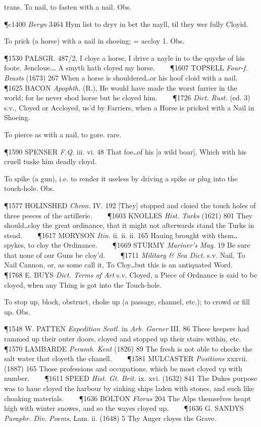 \begin{description}[wide, labelwidth=!, labelindent=0pt]
\begin{myenumerate}

 trans. To nail, to fasten with a nail. Obs.

\P c1400  \textit{Beryn} 3464 Hym list to dryv in bet the nayll, til they wer fully Cloyid.

 To prick (a horse) with a nail in shoeing; = accloy 1. Obs.

\P 1530 PALSGR. 487/2, I cloye a horse, I drive a nayle in to the quycke of his foote. Jencloue.‥ A smyth hath cloyed my horse.    
\P 1607 TOPSELL  \textit{Four-f. Beasts} (1673) 267 When a horse is shouldered‥or his hoof cloid with a nail.    
\P 1625 BACON  \textit{Apophth.} (R.), He would have made the worst farrier in the world; for he never shod horse but he cloyed him.    
\P 1726 \textit{Dict.  Rust.} (ed. 3) s.v., Cloyed or Accloyed, us'd by Farriers, when a Horse is pricked with a Nail in Shoeing.

 To pierce as with a nail, to gore. rare.

\P 1590 SPENSER  \textit{F.Q.} iii. vi. 48 That foe‥of his [a wild boar], Which with his cruell tuske him deadly cloyd.

 To spike (a gun), i.e. to render it useless by driving a spike or plug into the touch-hole. Obs.

\P 1577 HOLINSHED  \textit{Chron.} IV. 192 [They] stopped and cloied the touch holes of three peeces of the artillerie.    
\P 1603 KNOLLES  \textit{Hist. Turks} (1621) 801 They should‥cloy the great ordinance, that it might not afterwards stand the Turks in stead.    
\P 1617 MORYSON  \textit{Itin.} ii. ii. ii. 165 Hauing brought with them‥spykes, to cloy the Ordinance.    
\P 1669 STURMY  \textit{Mariner's Mag.} 19 Be sure that none of our Guns be cloy'd.    
\P 1711 \textit{Military \& Sea  Dict.} s.v. Nail, To Nail Cannon, or, as some call it, To Cloy‥but this is an antiquated Word.    
\P 1768 E. BUYS  \textit{Dict. Terms of Art} s.v. Cloyed, a Piece of Ordnance is said to be cloyed, when any Thing is got into the Touch-hole.

 To stop up, block, obstruct, choke up (a passage, channel, etc.); to crowd or fill up. Obs.

\P 1548 W. PATTEN  \textit{Expedition Scotl.} in \textit{Arb. Garner} III. 86 These keepers had rammed up their outer doors, cloyed and stopped up their stairs within, etc.    
\P 1570 LAMBARDE  \textit{Peramb. Kent} (1826) 89 The fresh is not able to checke the salt water that cloyeth the chanell.    
\P 1581 MULCASTER  \textit{Positions} xxxvii. (1887) 165 Those professions and occupations, which be most cloyed vp with number.    
\P 1611 SPEED  \textit{Hist. Gt. Brit.} ix. xvi. (1632) 841 The Dukes purpose was to haue cloyed the harbour by sinking ships laden with stones, and such like choaking materials.    
\P 1636 BOLTON  \textit{Florus} 204 The Alps themselves heapt high with winter snowes, and so the wayes cloyed up.    
\P 1636 G. SANDYS  \textit{Paraphr. Div. Poems}, Lam. ii. (1648) 5 Thy Anger cloyes the Grave.


\end{myenumerate}
\end{description}
